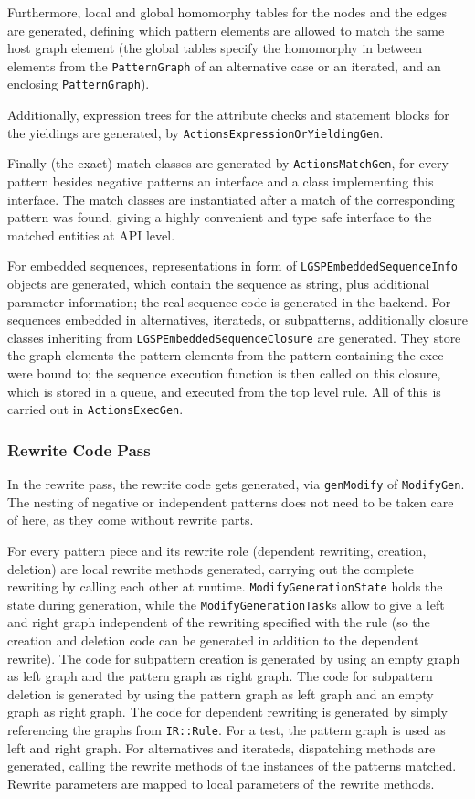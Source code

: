 Furthermore, local and global homomorphy tables for the nodes and the edges are generated, defining which pattern elements are allowed to match the same host graph element (the global tables specify the homomorphy in between elements from the \texttt{Pattern\-Graph} of an alternative case or an iterated, and an enclosing \texttt{Pattern\-Graph}).

Additionally, expression trees for the attribute checks and statement blocks for the yieldings are generated, by \texttt{ActionsExpressionOrYieldingGen}.

Finally (the exact) match classes are generated by \texttt{Actions\-Match\-Gen}, for every pattern besides negative patterns an interface and a class implementing this interface.
The match classes are instantiated after a match of the corresponding pattern was found, giving a highly convenient and type safe interface to the matched entities at API level.

For embedded sequences, representations in form of \texttt{LGSP\-Embedded\-Sequence\-Info} objects are generated, which contain the sequence as string, plus additional parameter information; the real sequence code is generated in the backend.
For sequences embedded in alternatives, iterateds, or subpatterns, additionally closure classes inheriting from \texttt{LGSP\-Embedded\-Sequence\-Closure} are generated.
They store the graph elements the pattern elements from the pattern containing the exec were bound to; the sequence execution function is then called on this closure, which is stored in a queue, and executed from the top level rule.
All of this is carried out in \texttt{ActionsExecGen}.

\subsubsection*{Rewrite Code Pass}
In the rewrite pass, the rewrite code gets generated, via \texttt{gen\-Modify} of \texttt{Modify\-Gen}.
The nesting of negative or independent patterns does not need to be taken care of here, as they come without rewrite parts.

For every pattern piece and its rewrite role (dependent rewriting, creation, deletion) are local rewrite methods generated, carrying out the complete rewriting by calling each other at runtime.
\texttt{Modify\-Generation\-State} holds the state during generation, while the \texttt{Modify\-Generation\-Task}s allow to give a left and right graph independent of the rewriting specified with the rule (so the creation and deletion code can be generated in addition to the dependent rewrite).
The code for subpattern creation is generated by using an empty graph as left graph and the pattern graph as right graph.
The code for subpattern deletion is generated by using the pattern graph as left graph and an empty graph as right graph.
The code for dependent rewriting is generated by simply referencing the graphs from \texttt{IR::Rule}.
For a test, the pattern graph is used as left and right graph.
For alternatives and iterateds, dispatching methods are generated, calling the rewrite methods of the instances of the patterns matched.
Rewrite parameters are mapped to local parameters of the rewrite methods.

